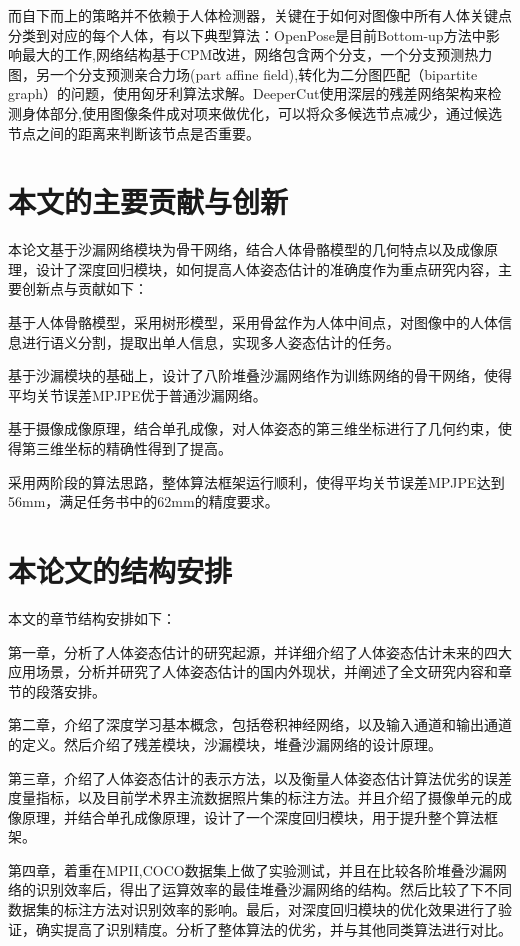 而自下而上的策略并不依赖于人体检测器，关键在于如何对图像中所有人体关键点分类到对应的每个人体，有以下典型算法：OpenPose是目前Bottom-up方法中影响最大的工作,网络结构基于CPM改进，网络包含两个分支，一个分支预测热力图，另一个分支预测亲合力场(part affine field),转化为二分图匹配（bipartite graph）的问题，使用匈牙利算法求解。DeeperCut使用深层的残差网络架构来检测身体部分,使用图像条件成对项来做优化，可以将众多候选节点减少，通过候选节点之间的距离来判断该节点是否重要。

\section{本文的主要贡献与创新}

本论文基于沙漏网络模块为骨干网络，结合人体骨骼模型的几何特点以及成像原理，设计了深度回归模块，如何提高人体姿态估计的准确度作为重点研究内容，主要创新点与贡献如下：

基于人体骨骼模型，采用树形模型，采用骨盆作为人体中间点，对图像中的人体信息进行语义分割，提取出单人信息，实现多人姿态估计的任务。

基于沙漏模块的基础上，设计了八阶堆叠沙漏网络作为训练网络的骨干网络，使得平均关节误差MPJPE优于普通沙漏网络。

基于摄像成像原理，结合单孔成像，对人体姿态的第三维坐标进行了几何约束，使得第三维坐标的精确性得到了提高。

采用两阶段的算法思路，整体算法框架运行顺利，使得平均关节误差MPJPE达到56mm，满足任务书中的62mm的精度要求。

\section{本论文的结构安排}

本文的章节结构安排如下：

第一章，分析了人体姿态估计的研究起源，并详细介绍了人体姿态估计未来的四大应用场景，分析并研究了人体姿态估计的国内外现状，并阐述了全文研究内容和章节的段落安排。

第二章，介绍了深度学习基本概念，包括卷积神经网络，以及输入通道和输出通道的定义。然后介绍了残差模块，沙漏模块，堆叠沙漏网络的设计原理。

第三章，介绍了人体姿态估计的表示方法，以及衡量人体姿态估计算法优劣的误差度量指标，以及目前学术界主流数据照片集的标注方法。并且介绍了摄像单元的成像原理，并结合单孔成像原理，设计了一个深度回归模块，用于提升整个算法框架。

第四章，着重在MPII,COCO数据集上做了实验测试，并且在比较各阶堆叠沙漏网络的识别效率后，得出了运算效率的最佳堆叠沙漏网络的结构。然后比较了下不同数据集的标注方法对识别效率的影响。最后，对深度回归模块的优化效果进行了验证，确实提高了识别精度。分析了整体算法的优劣，并与其他同类算法进行对比。